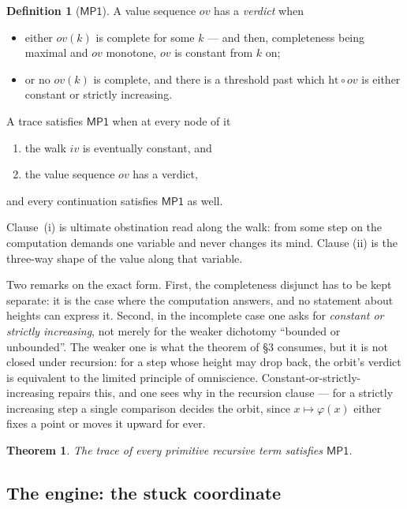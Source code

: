 \documentclass[11pt]{article}
\newcommand{\hgt}{\mathrm{ht}}
\newcommand{\MP}{\mathsf{MP1}}
\newcommand{\ovv}{\mathit{ov}}
\newcommand{\ivv}{\mathit{iv}}
\newtheorem{theorem}{Theorem}
\theoremstyle{definition}
\newtheorem{definition}{Definition}
\begin{document}
\begin{definition}[$\MP$]
\label{def:mp1}
A value sequence $\ovv$ has a \emph{verdict} when
\begin{itemize}
\item either $\ovv(k)$ is complete for some $k$ --- and then, completeness
  being maximal and $\ovv$ monotone, $\ovv$ is constant from $k$ on;
\item or no $\ovv(k)$ is complete, and there is a threshold past which
  $\hgt \circ \ovv$ is either constant or strictly increasing.
\end{itemize}
A trace satisfies $\MP$ when at every node of it
\begin{enumerate}
\item[(i)] the walk $\ivv$ is eventually constant, and
\item[(ii)] the value sequence $\ovv$ has a verdict,
\end{enumerate}
and every continuation satisfies $\MP$ as well.
\end{definition}

Clause~(i) is ultimate obstination read along the walk: from some step on
the computation demands one variable and never changes its mind. Clause
(ii) is the three-way shape of the value along that variable.

Two remarks on the exact form. First, the completeness disjunct has to be
kept separate: it is the case where the computation answers, and no
statement about heights can express it. Second, in the incomplete case one
asks for \emph{constant or strictly increasing}, not merely for the
weaker dichotomy ``bounded or unbounded''. The weaker one is what the
theorem of \S3 consumes, but it is not closed under recursion: for a step
whose height may drop back, the orbit's verdict is equivalent to the
limited principle of omniscience. Constant-or-strictly-increasing repairs
this, and one sees why in the recursion clause --- for a strictly
increasing step a single comparison decides the orbit, since $x \mapsto
\varphi(x)$ either fixes a point or moves it upward for ever.

\begin{theorem}
\label{thm:mp1}
The trace of every primitive recursive term satisfies $\MP$.
\end{theorem}

\subsection{The engine: the stuck coordinate}
\end{document}

